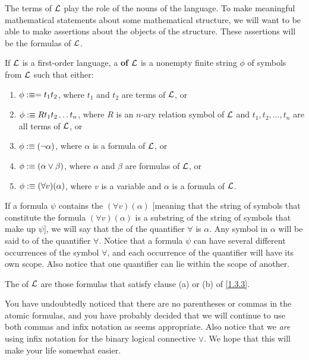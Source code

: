 \begin{note}
  The terms of \(\mathcal{L}\) play the role of the nouns of the language.
  To make meaningful mathematical statements about some mathematical structure, we will want to be able to make assertions about the objects of the structure.
  These assertions will be the formulas of \(\mathcal{L}\).
\end{note}

\setcounter{thm}{2}
\begin{defn}\label{1.3.3}
  If \(\mathcal{L}\) is a first-order language, a \textbf{ of \(\mathcal{L}\)} is a nonempty finite string \(\phi\) of symbols from \(\mathcal{L}\) such that either:
  \begin{enumerate}
    \item \(\phi :\equiv = t_1 t_2\), where \(t_1\) and \(t_2\) are terms of \(\mathcal{L}\), or
    \item \(\phi :\equiv R t_1 t_2 \dots t_n\), where \(R\) is an \(n\)-ary relation symbol of \(\mathcal{L}\) and \(t_1, t_2, \dots, t_n\) are all terms of \(\mathcal{L}\), or
    \item \(\phi :\equiv (\lnot \alpha)\), where \(\alpha\) is a formula of \(\mathcal{L}\), or
    \item \(\phi :\equiv (\alpha \lor \beta)\), where \(\alpha\) and \(\beta\) are formulas of \(\mathcal{L}\), or
    \item \(\phi :\equiv (\forall v)(\alpha)\), where \(v\) is a variable and \(\alpha\) is a formula of \(\mathcal{L}\).
  \end{enumerate}
  If a formula \(\psi\) contains the  \((\forall v)(\alpha)\)
  [meaning that the string of symbols that constitute the formula \((\forall v)(\alpha)\) is a substring of the string of symbols that make up \(\psi\)],
  we will say that the \textbf{} of the quantifier \(\forall\) is \(\alpha\).
  Any symbol in \(\alpha\) will be said to  of the quantifier \(\forall\).
  Notice that a formula \(\psi\) can have several different occurrences of the symbol \(\forall\), and each occurrence of the quantifier will have its own scope.
  Also notice that one quantifier can lie within the scope of another.

  The \textbf{} of \(\mathcal{L}\) are those formulas that satisfy clause (a) or (b) of \cref{1.3.3}.
\end{defn}

\begin{note}
  You have undoubtedly noticed that there are no parentheses or commas in the atomic formulas, and you have probably decided that we will continue to use both commas and infix notation as seems appropriate.
  Also notice that we \emph{are} using infix notation for the binary logical connective \(\lor\).
  We hope that this will make your life somewhat easier.
\end{note}

